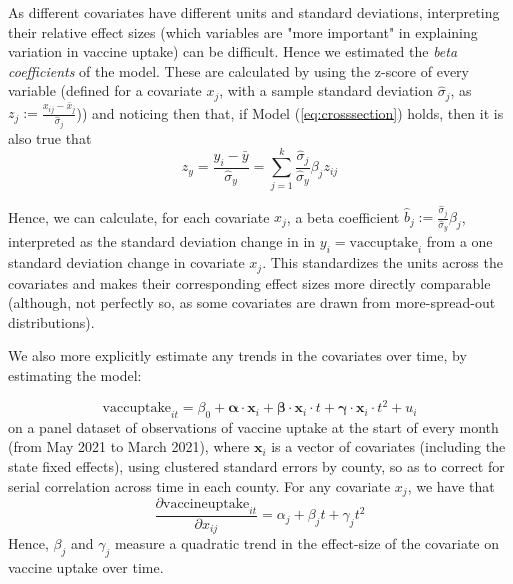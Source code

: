 \documentclass[12pt]{article}
\begin{document}
\begin{spacing}{1.5}
		As different covariates have different units and standard deviations, interpreting their relative effect sizes (which variables are "more important" in explaining variation in vaccine uptake) can be difficult. Hence we estimated the \textit{beta coefficients} of the model. These are calculated by using the z-score of every variable (defined for a covariate $x_j$, with a sample standard deviation $\hat{\sigma}_j$, as $z_j := \frac{x_{ij}-\bar{x}_j}{\hat{\sigma}_j}$)) and noticing then that, if Model (\ref{eq:crosssection}) holds, then it is also true that
		\begin{equation} \label{eq:standardized}
			z_y=\frac{y_i-\bar{y}}{\hat{\sigma}_y} = \sum_{j=1}^{k} \frac{\hat{\sigma}_j}{\hat{\sigma}_y}\beta_j z_{ij}
		\end{equation}
		
		Hence, we can calculate, for each covariate $x_j$, a beta coefficient $\hat{b}_j := \frac{\hat{\sigma}_j}{\hat{\sigma}_y}\beta_j$, interpreted as the standard deviation change in in $y_i=\textrm{vaccuptake}_i$ from a one standard deviation change in covariate $x_j$. This standardizes the units across the covariates and makes their corresponding effect sizes more directly comparable (although, not perfectly so, as some covariates are drawn from more-spread-out distributions).
		
		We also more explicitly estimate any trends in the covariates over time, by estimating the model:
		
		\begin{equation}
			\textrm{vaccuptake}_{it} =  \beta_0 + \boldsymbol{\alpha}\cdot\mathbf{x}_{i} + \boldsymbol{\beta}\cdot\mathbf{x}_{i}\cdot t + \boldsymbol{\gamma}\cdot\mathbf{x}_{i}\cdot t^2 + u_i
		\end{equation}
		on a panel dataset of observations of vaccine uptake at the start of every month (from May 2021 to March 2021), where $\mathbf{x}_{i}$ is a vector of covariates (including the state fixed effects), using clustered standard errors by county, so as to correct for serial correlation across time in each county. For any covariate $x_j$, we have that
		\begin{equation} \label{eq:trends}
			\frac{\partial \textrm{vaccineuptake}_{it}}{\partial x_{ij}} = \alpha_j + \beta_jt + \gamma_jt^2
		\end{equation}
		Hence, $\beta_j$ and $\gamma_j$ measure a quadratic trend in the effect-size of the covariate on vaccine uptake over time.
		

\end{spacing}
\end{document}

